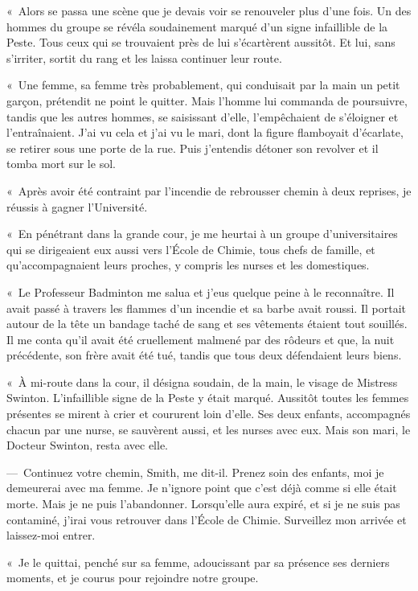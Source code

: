 \documentclass[french,twoside]{book} %
\begin{document}
« Alors se passa une scène que je devais voir se renouveler plus d’une fois. Un des hommes du groupe se révéla soudainement marqué d’un signe infaillible de la Peste. Tous ceux qui se trouvaient près de lui s’écartèrent aussitôt. Et lui, sans s’irriter, sortit du rang et les laissa continuer leur route.\par
« Une femme, sa femme très probablement, qui conduisait par la main un petit garçon, prétendit ne point le quitter. Mais l’homme lui commanda de poursuivre, tandis que les autres hommes, se saisissant d’elle, l’empêchaient de s’éloigner et l’entraînaient. J’ai vu cela et j’ai vu le mari, dont la figure flamboyait d’écarlate, se retirer sous une porte de la rue. Puis j’entendis détoner son revolver et il tomba mort sur le sol.\par
« Après avoir été contraint par l’incendie de rebrousser chemin à deux reprises, je réussis à gagner l’Université.\par
« En pénétrant dans la grande cour, je me heurtai à un groupe d’universitaires qui se dirigeaient eux aussi vers l’École de Chimie, tous chefs de famille, et qu’accompagnaient leurs proches, y compris les nurses et les domestiques.\par
« Le Professeur Badminton me salua et j’eus quelque peine à le reconnaître. Il avait passé à travers les flammes d’un incendie et sa barbe avait roussi. Il portait autour de la tête un bandage taché de sang et ses vêtements étaient tout souillés. Il me conta qu’il avait été cruellement malmené par des rôdeurs et que, la nuit précédente, son frère avait été tué, tandis que tous deux défendaient leurs biens.\par
« À mi-route dans la cour, il désigna soudain, de la main, le visage de Mistress Swinton. L’infaillible signe de la Peste y était marqué. Aussitôt toutes les femmes présentes se mirent à crier et coururent loin d’elle. Ses deux enfants, accompagnés chacun par une nurse, se sauvèrent aussi, et les nurses avec eux. Mais son mari, le Docteur Swinton, resta avec elle.\par
— Continuez votre chemin, Smith, me dit-il. Prenez soin des enfants, moi je demeurerai avec ma femme. Je n’ignore point que c’est déjà comme si elle était morte. Mais je ne puis l’abandonner. Lorsqu’elle aura expiré, et si je ne suis pas contaminé, j’irai vous retrouver dans l’École de Chimie. Surveillez mon arrivée et laissez-moi entrer.\par
« Je le quittai, penché sur sa femme, adoucissant par sa présence ses derniers moments, et je courus pour rejoindre notre groupe.\par
\end{document}
